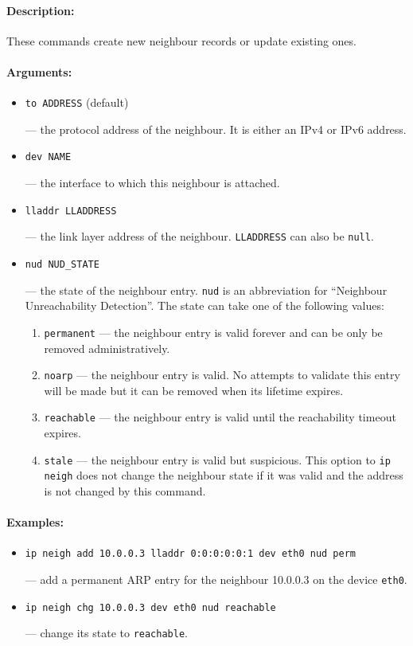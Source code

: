 \paragraph{Description:} These commands create new neighbour records
or update existing ones.

\paragraph{Arguments:}

\begin{itemize}
\item \verb|to ADDRESS| (default)

--- the protocol address of the neighbour. It is either an IPv4 or IPv6 address.

\item \verb|dev NAME|

--- the interface to which this neighbour is attached.


\item \verb|lladdr LLADDRESS|

--- the link layer address of the neighbour. \verb|LLADDRESS| can also be
\verb|null|. 

\item \verb|nud NUD_STATE|

--- the state of the neighbour entry. \verb|nud| is an abbreviation for ``Neighbour
Unreachability Detection''. The state can take one of the following values:

\begin{enumerate}
\item \verb|permanent| --- the neighbour entry is valid forever and can be only be removed
administratively.
\item \verb|noarp| --- the neighbour entry is valid. No attempts to validate
this entry will be made but it can be removed when its lifetime expires.
\item \verb|reachable| --- the neighbour entry is valid until the reachability
timeout expires.
\item \verb|stale| --- the neighbour entry is valid but suspicious.
This option to \verb|ip neigh| does not change the neighbour state if
it was valid and the address is not changed by this command.
\end{enumerate}

\end{itemize}

\paragraph{Examples:}
\begin{itemize}
\item \verb|ip neigh add 10.0.0.3 lladdr 0:0:0:0:0:1 dev eth0 nud perm|

--- add a permanent ARP entry for the neighbour 10.0.0.3 on the device \verb|eth0|.

\item \verb|ip neigh chg 10.0.0.3 dev eth0 nud reachable|

--- change its state to \verb|reachable|.
\end{itemize}


